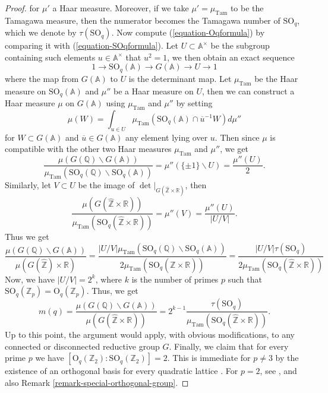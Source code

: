 \begin{proof}
for $\mu'$ a Haar measure. Moreover, if we take $\mu'=\mu_{\text{Tam}}$ to be the Tamagawa measure, then the numerator becomes the Tamagawa number of $\text{SO}_q$, which we denote by $\tau(\text{SO}_q)$. Now compute (\ref{equation-Oqformula}) by comparing it with (\ref{equation-SOqformula}). Let $U\subset \mathbb{A}^{\times}$ be the subgroup containing such elements $u\in \mathbb{A}^{\times}$ that $u^2=1$, we then obtain an exact sequence 
\[
	1\rightarrow \text{SO}_q(\mathbb{A})\rightarrow G(\mathbb{A})\rightarrow U\rightarrow 1
\] 
where the map from $G(\mathbb{A})$ to $U$ is the determinant map. Let $\mu_{\text{Tam}}$ be the Haar measure on $\text{SO}_q(\mathbb{A})$ and $\mu''$ be a Haar measure on $U$, then we can construct a Haar measure $\mu$ on  $G(\mathbb{A})$ using $\mu_{\text{Tam}}$ and  $\mu''$ by setting 
\[
	\mu(W)=\int_{u\in U} \mu_{\text{Tam}}(\text{SO}_q(\mathbb{A})\cap \overline{u}^{-1}W)d\mu''
\] 
for $W\subset G(\mathbb{A})$ and $\overline{u}\in G(\mathbb{A})$ any element lying over $u$.
Then since $\mu$ is compatible with the other two Haar measures $\mu_{\text{Tam}}$ and $\mu''$, we get
\[
	\frac{\mu(G(\mathbb{Q})\backslash G(\mathbb{A}))}{\mu_{\text{Tam}}(\text{SO}_q(\mathbb{Q})\backslash\text{SO}_q(\mathbb{A}))}=\mu''(\{\pm 1\}\backslash U)=\frac{\mu''(U)}{2}. 
\] 
Similarly, let $V\subset U$ be the image of $\det|_{G(\hat{\mathbb{Z}}\times\mathbb{R})}$, then
 \[
	 \frac{\mu(G(\hat{\mathbb{Z}}\times \mathbb{R}))}{\mu_{\text{Tam}}(\text{SO}_q(\hat{\mathbb{Z}}\times \mathbb{R}))}=\mu''(V)=\frac{\mu''(U)}{|U/V|}.
\] 
Thus we get 
\[
	\frac{\mu(G(\mathbb{Q})\backslash G(\mathbb{A}))}{\mu(G(\hat{\mathbb{Z}})\times \mathbb{R})}= \frac{|U/V|\mu_{\text{Tam}}(\text{SO}_q(\mathbb{Q})\backslash \text{SO}_q(\mathbb{A}))}{2\mu_{\text{Tam}}(\text{SO}_q(\hat{\mathbb{Z}}\times \mathbb{R}))}= \frac{|U/V|\tau(\text{SO}_q)}{2\mu_{\text{Tam}}(\text{SO}_q(\hat{\mathbb{Z}}\times \mathbb{R}))}
\] 
Now, we have $|U/V| = 2^{k}$, where $k$ is the number of primes $p$ such that $\text{SO}_{q}(\mathbb{Z}_p)=\text{O}_{q}(\mathbb{Z}_p)$. Thus, we get
\[
	m(q)=\frac{\mu(G(\mathbb{Q})\backslash G(\mathbb{A}))}{\mu(G(\hat{\mathbb{Z}}\times \mathbb{R}))}=2^{k-1}\frac{\tau(\text{SO}_q)}{\mu_{\text{Tam}}(\text{SO}_q(\hat{\mathbb{Z}}\times \mathbb{R}))}.
\] 
Up to this point, the argument would apply, with obvious modifications, to any connected or disconnected reductive group $G$. Finally, we claim that for every prime $p$ we have $[\text{O}_q(\mathbb Z_2):\text{SO}_q(\mathbb Z_2)]=2$. This is immediate for $p\ne 3$ by the existence of an orthogonal basis for every quadratic lattice \cite[\S 92]{OMeara}. For $p=2$, see \cite[\S 93]{OMeara}, and also Remark \ref{remark-special-orthogonal-group}.
\end{proof}

